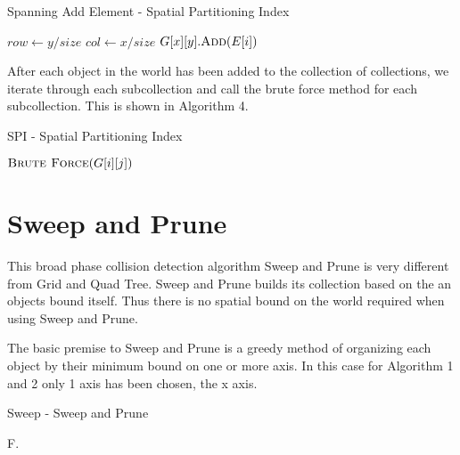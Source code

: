 \documentclass[conference]{IEEEtran}
\begin{document}
\begin{algorithm}
\caption{Spanning Add Element - Spatial Partitioning Index}
\begin{algorithmic}[1]
                                \State $row \leftarrow y / size$
                                \State $col \leftarrow x / size$
                                        \State $G[x][y].\Call{Add}{E[i]}$
                                \EndIf
                        \EndFor
                \EndFor
        \EndFor
\EndFunction
\end{algorithmic}
\end{algorithm}

After each object in the world has been added to the collection of collections, we iterate through each subcollection and call the brute force method for each subcollection. This is shown in Algorithm 4.

\begin{algorithm}
\caption{SPI - Spatial Partitioning Index}
\begin{algorithmic}[1]
                        \State $\Call{Brute Force}{G[i][j]}$
                \EndFor
        \EndFor
\EndFunction
\end{algorithmic}
\end{algorithm}

\section{Sweep and Prune}

This broad phase collision detection algorithm Sweep and Prune is very different from Grid and Quad Tree. Sweep and Prune builds its collection based on the an objects bound itself. Thus there is no spatial bound on the world required when using Sweep and Prune.

The basic premise to Sweep and Prune is a greedy method of organizing each object by their minimum bound on one or more axis. In this case for Algorithm 1 and 2 only 1 axis has been chosen, the x axis.

\begin{algorithm}
\caption{Sweep - Sweep and Prune}
\begin{algorithmic}[1]
                \State {}
                \State F.
                \State {}
        \EndFor
\EndFunction
\end{algorithmic}
\end{algorithm}
\end{document}
